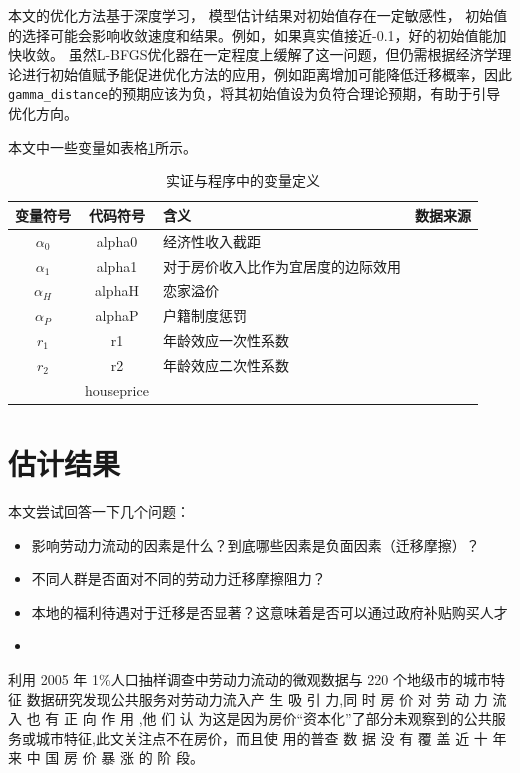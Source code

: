 \documentclass[a4paper,12pt,oneside, fontset=mac]{ctexbook} %
\begin{document}
本文的优化方法基于深度学习，
模型估计结果对初始值存在一定敏感性，
初始值的选择可能会影响收敛速度和结果。例如，如果真实值接近-0.1，好的初始值能加快收敛。
虽然L-BFGS优化器在一定程度上缓解了这一问题，但仍需根据经济学理论进行初始值赋予能促进优化方法的应用，例如距离增加可能降低迁移概率，因此\lstinline{gamma_distance}的预期应该为负，将其初始值设为负符合理论预期，有助于引导优化方向。


本文中一些变量如表格\ref{tab:_实证与程序中的变量定义}所示。

\begin{table}
\centering
\caption{实证与程序中的变量定义}
\begin{tabularx}{\textwidth}{@{}ccXX@{}}
\toprule
变量符号 & 代码符号 & 含义 & 数据来源\\
\midrule
$\alpha_0$ & alpha0 & 经济性收入截距 &\\
$\alpha_1$ & alpha1 & 对于房价收入比作为宜居度的边际效用&\\
$\alpha_H$ & alphaH & 恋家溢价&\\
$\alpha_P$ & alphaP & 户籍制度惩罚&\\
$r_1$ & r1 & 年龄效应一次性系数& \\
$r_2$ & r2 & 年龄效应二次性系数& \\
 & houseprice & &\\
\bottomrule
\end{tabularx}
\label{tab:_实证与程序中的变量定义}
\end{table}

\chapter{估计结果}

本文尝试回答一下几个问题：
\begin{itemize}
  \item 影响劳动力流动的因素是什么？到底哪些因素是负面因素（迁移摩擦）？
  \item 不同人群是否面对不同的劳动力迁移摩擦阻力？
  \item 本地的福利待遇对于迁移是否显著？这意味着是否可以通过政府补贴购买人才
  \item 
\end{itemize}


\cite{XiaYiRanChengShiJianDeMengMuSanQianGongGongFuWuYingXiangLaoDongLiLiuXiangDeJingYanYanJiu2015} 利用 2005 年 1\%人口抽样调查中劳动力流动的微观数据与 220 个地级市的城市特征 数据研究发现公共服务对劳动力流入产 生 吸 引 力,同 时 房 价 对 劳 动 力 流 入 也 有 正 向 作 用 ,他 们 认 为这是因为房价“资本化”了部分未观察到的公共服务或城市特征,此文关注点不在房价，而且使 用的普查 数 据 没 有 覆 盖 近 十 年 来 中 国 房 价 暴 涨 的 阶 段。
\end{document}
